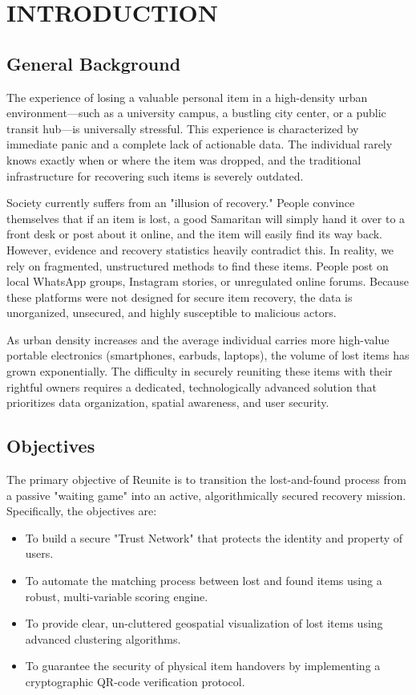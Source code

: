 \documentclass[12pt,a4paper]{report}
\begin{document}
\chapter{INTRODUCTION}

\section{General Background}
The experience of losing a valuable personal item in a high-density urban environment—such as a university campus, a bustling city center, or a public transit hub—is universally stressful. This experience is characterized by immediate panic and a complete lack of actionable data. The individual rarely knows exactly when or where the item was dropped, and the traditional infrastructure for recovering such items is severely outdated. 

Society currently suffers from an "illusion of recovery." People convince themselves that if an item is lost, a good Samaritan will simply hand it over to a front desk or post about it online, and the item will easily find its way back. However, evidence and recovery statistics heavily contradict this. In reality, we rely on fragmented, unstructured methods to find these items. People post on local WhatsApp groups, Instagram stories, or unregulated online forums. Because these platforms were not designed for secure item recovery, the data is unorganized, unsecured, and highly susceptible to malicious actors.

As urban density increases and the average individual carries more high-value portable electronics (smartphones, earbuds, laptops), the volume of lost items has grown exponentially. The difficulty in securely reuniting these items with their rightful owners requires a dedicated, technologically advanced solution that prioritizes data organization, spatial awareness, and user security.

\section{Objectives}
The primary objective of Reunite is to transition the lost-and-found process from a passive "waiting game" into an active, algorithmically secured recovery mission. 
Specifically, the objectives are:
\begin{itemize}
    \item To build a secure "Trust Network" that protects the identity and property of users.
    \item To automate the matching process between lost and found items using a robust, multi-variable scoring engine.
    \item To provide clear, un-cluttered geospatial visualization of lost items using advanced clustering algorithms.
    \item To guarantee the security of physical item handovers by implementing a cryptographic QR-code verification protocol.
\end{itemize}
\end{document}
